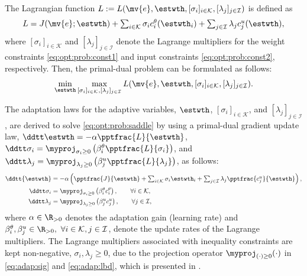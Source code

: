 \documentclass[letterpaper, journal, twoside]{IEEEtran}
\begin{document}
The Lagrangian function $L:=L(\mv{e},\estwth,[\sigma_i]_{i\in\mathcal{K}},[\lambda_j]_{j\in\mathcal I})$ is defined as
\begin{equation}
  L
  = 
  J(\mv{e};\estwth) 
  + 
  \textstyle\sum_{i\in\mathcal{K}}
  \sigma_{i}
  c^{\theta}_{i}(\estwth_i)
  +
  \textstyle\sum_{j\in\mathcal I}
  \lambda_{j}
  c^{u}_{j}(\estwth)
  ,
  \label{eq:lagrangian}
\end{equation}
where $[\sigma_i]_{i\in\mathcal{K}}$ and $[\lambda_j]_{j\in\mathcal{I}}$ denote the Lagrange multipliers for the weight constraints \eqref{eq:opt:prob:const1} and input constraints \eqref{eq:opt:prob:const2}, respectively.
Then, the primal-dual problem can be formulated as follows:
\begin{equation} \label{eq:opt:prob:saddle}
  \min_{\estwth}
  \max_{
    [\sigma_i]_{i\in\mathcal{K}}
    ,
    [\lambda_j]_{j\in\mathcal{I}}
  } 
  L(\mv{e},\estwth,[\sigma_i]_{i\in\mathcal{K}},[\lambda_j]_{j\in\mathcal I})
  .
\end{equation}

The adaptation laws for the adaptive variables, $\estwth$, $[\sigma_i]_{i\in\mathcal{K}}$, and $[\lambda_j]_{j\in\mathcal{I}}$, are derived to solve \eqref{eq:opt:prob:saddle} by using a primal-dual gradient update law, \ie 
$
  \ddtt\estwth 
  = 
  -\alpha \pptfrac{L}{\estwth}
$, $
  \ddtt\sigma_i 
  = 
  \myproj_{\sigma_i\ge0}
  \left(
      \beta_i^\theta 
      \pptfrac{L}{\sigma_i}
  \right)
$, and $
  \ddtt\lambda_j 
  = 
  \myproj_{\lambda_j\ge0}
  \left(
    \beta_j^u 
    \pptfrac{L}{\lambda_j}
  \right)
$, as follows:
\begin{subequations} \label{eq:adap}
  \begin{align}
    \ddtt{\estwth}
    &
    =
    -\alpha 
    \left(
      \pptfrac{J}{\estwth}
      +
      \textstyle\sum_{i\in\mathcal{K}}
      \sigma_i 
      \estwth_i
      +
      \textstyle\sum_{j\in\mathcal{I}}
      \lambda_j 
      \pptfrac{c^{u}_{j}}{\estwth}
    \right),
    \label{eq:adap:th}
    \\
    \ddtt\sigma_i
    & 
    = 
    \myproj_{\sigma_i\ge0}
      \left(
      \beta_i^{\theta}
      c^{\theta}_{i} 
    \right)
    ,
    \qquad \forall i\in\mathcal{K},
    \label{eq:adap:sig}
    \\
    \ddtt\lambda_j
    & 
    = 
    \myproj_{\lambda_j\ge0}
      \left(
      \beta_j^{u}
      c^{u}_{j} 
    \right)
    ,
    \qquad \forall j\in\mathcal{I},
    \label{eq:adap:lbd}
  \end{align}%
\end{subequations}
where $\alpha\in\R_{>0}$ denotes the adaptation gain (learning rate) and $\beta_i^{\theta},\beta_j^{u}\in\R_{>0},\ \forall i\in\mathcal{K},j\in\mathcal{I}$, denote the update rates of the Lagrange multipliers. 
The Lagrange multipliers associated with inequality constraints are kept non-negative, \ie $\sigma_i,\lambda_j\ge 0$, due to the projection operator $\myproj_{(\cdot)\ge0}(\cdot)$ in \eqref{eq:adap:sig} and \eqref{eq:adap:lbd}, which is presented in \cite[Appendix E, eq. (E.4)]{Krstic:1995aa}.
\end{document}
